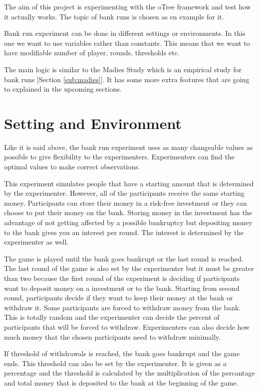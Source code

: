 The aim of this project is experimenting with the oTree framework and test how it actually works. The topic of bank runs is chosen as en example for it. 

Bank run experiment can be done in different settings or environments. In this one we want to use variables rather than constants. This means that we want to have modifiable number of player, rounds, thresholds etc. 

The main logic is similar to the Madies Study which is an empirical study for bank runs [Section \ref{sub:madies}]. It has some more extra features that are going to explained in the upcoming sections.

\section{Setting and Environment}

Like it is said above, the bank run experiment uses as many changeable values as possible to give flexibility to the experimenters. Experimenters can find the optimal values to make correct observations. 

This experiment simulates people that have a starting amount that is determined by the experimenter. However, all of the participants receive the same starting money. Participants can store their money in a risk-free investment or they can choose to put their money on the bank. Storing money in the investment has the advantage of not getting affected by a possible bankruptcy but depositing money to the bank gives you an interest per round. The interest is determined by the experimenter as well. 

The game is played until the bank goes bankrupt or the last round is reached. The last round of the game is also set by the experimenter but it must be greater than two because the first round of the experiment is deciding if participants want to deposit money on a investment or to the bank. Starting from second round, participants decide if they want to keep their money at the bank or  withdraw it. Some participants are forced to withdraw money from the bank. This is totally random and the experimenter can decide the percent of participants that will be forced to withdraw. Experimenters can also decide how much money that the chosen participants need to withdraw minimally. 

If threshold of withdrawals is reached, the bank goes bankrupt and the game ends. This threshold can also be set by the experimenter. It is given as a percentage and the threshold is calculated by the multiplication of the percantage and total money that is deposited to the bank at the beginning of the game. 

